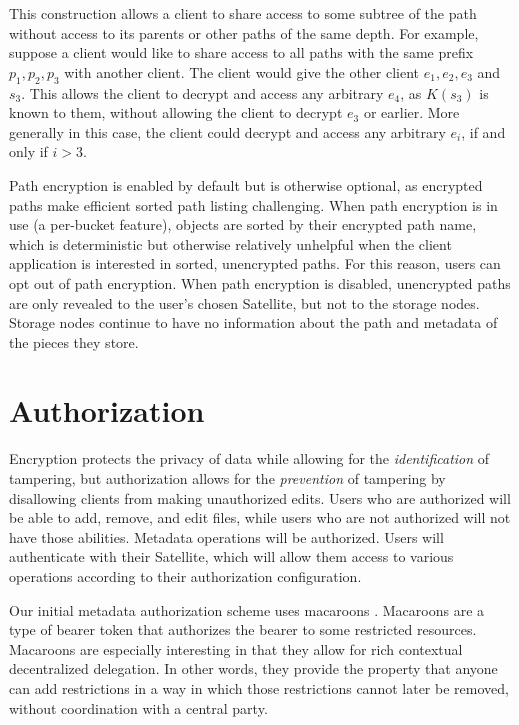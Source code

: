 \documentclass[8pt,fleqn,openany]{book}
\begin{document}
This construction allows a client to share access to some subtree of the
path without access to its parents or other paths of the same depth. For
example, suppose a client would like to share access to all paths with the
same prefix $p_1, p_2, p_3$ with another client. The client would give the
other client $e_1, e_2, e_3$ and $s_3$. This allows the client to decrypt
and access any arbitrary $e_4$, as $K(s_3)$ is known to them, without
allowing the client to decrypt $e_3$ or earlier. More generally
in this case, the client could decrypt and access any arbitrary $e_i$,
if and only if $i > 3$.

Path encryption is enabled by default but is otherwise optional, as encrypted
paths make efficient sorted path listing challenging.
When path encryption is in use (a per-bucket feature),
objects are sorted by their encrypted path name, which is deterministic
but otherwise relatively unhelpful
when the client application is interested in sorted, unencrypted paths.
For this reason, users can opt out of
path encryption. When path encryption is disabled, unencrypted paths
are only revealed to the user's chosen Satellite, but not to the storage
nodes. Storage nodes continue to have no information about the path and
metadata of the pieces they store.

\section{Authorization}\label{sec:concrete-authorization}

Encryption protects the privacy of data while allowing for the {\em identification}
of tampering, but authorization allows for the {\em prevention} of tampering by
disallowing clients from making unauthorized edits.
Users who are authorized will be able to add, remove,
and edit files, while users who are not authorized will not have those abilities.
Metadata operations will be authorized. Users will authenticate with
their Satellite, which will allow them access to various operations according
to their authorization configuration.

Our initial metadata authorization scheme uses macaroons \cite{macaroons}.
Macaroons are a type of bearer token that authorizes
the bearer to some restricted resources. Macaroons are especially interesting
in that they allow for rich contextual decentralized delegation. In other words, they
provide the property that anyone can add restrictions in a way in which those
restrictions cannot later be removed, without coordination with a central party.
\end{document}
